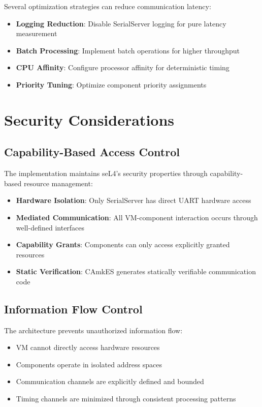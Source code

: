 \documentclass[12pt,a4paper]{article}
\begin{document}
Several optimization strategies can reduce communication latency:

\begin{itemize}
\item \textbf{Logging Reduction}: Disable SerialServer logging for pure latency measurement
\item \textbf{Batch Processing}: Implement batch operations for higher throughput
\item \textbf{CPU Affinity}: Configure processor affinity for deterministic timing
\item \textbf{Priority Tuning}: Optimize component priority assignments
\end{itemize}

\section{Security Considerations}

\subsection{Capability-Based Access Control}

The implementation maintains seL4's security properties through capability-based resource management:

\begin{itemize}
\item \textbf{Hardware Isolation}: Only SerialServer has direct UART hardware access
\item \textbf{Mediated Communication}: All VM-component interaction occurs through well-defined interfaces
\item \textbf{Capability Grants}: Components can only access explicitly granted resources
\item \textbf{Static Verification}: CAmkES generates statically verifiable communication code
\end{itemize}

\subsection{Information Flow Control}

The architecture prevents unauthorized information flow:

\begin{itemize}
\item VM cannot directly access hardware resources
\item Components operate in isolated address spaces
\item Communication channels are explicitly defined and bounded
\item Timing channels are minimized through consistent processing patterns
\end{itemize}
\end{document}
